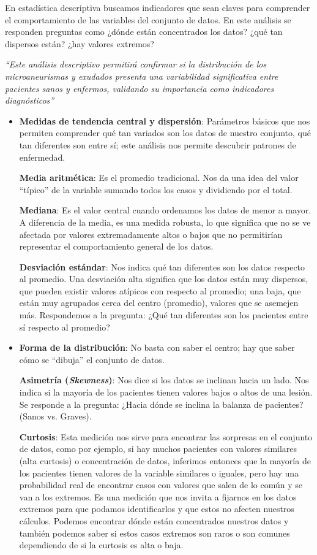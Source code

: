 En estadística descriptiva buscamos indicadores que sean claves para comprender el comportamiento de las variables del conjunto de datos. En este análisis se responden preguntas como ¿dónde están concentrados los datos? ¿qué tan dispersos están? ¿hay valores extremos?

\textit{``Este análisis descriptivo permitirá confirmar si la distribución de los microaneurismas y exudados presenta una variabilidad significativa entre pacientes sanos y enfermos, validando su importancia como indicadores diagnósticos''}

\begin{itemize}
    \item \textbf{Medidas de tendencia central y dispersión}: Parámetros básicos que nos permiten comprender qué tan variados son los datos de nuestro conjunto, qué tan diferentes son entre sí; este análisis nos permite descubrir patrones de enfermedad. 
    
    \textbf{Media aritmética}: Es el promedio tradicional. Nos da una idea del valor \enquote{típico} de la variable sumando todos los casos y dividiendo por el total.

    \textbf{Mediana}: Es el valor central cuando ordenamos los datos de menor a mayor. A diferencia de la media, es una medida robusta, lo que significa que no se ve afectada por valores extremadamente altos o bajos que no permitirían representar el comportamiento general de los datos.

    \textbf{Desviación estándar}: Nos indica qué tan diferentes son los datos respecto al promedio. Una desviación alta significa que los datos están muy dispersos, que pueden existir valores atípicos con respecto al promedio; una baja, que están muy agrupados cerca del centro (promedio), valores que se asemejen más. Respondemos a la pregunta: ¿Qué tan diferentes son los pacientes entre sí respecto al promedio?

    \item \textbf{Forma de la distribución}: No basta con saber el centro; hay que saber cómo se ``dibuja'' el conjunto de datos.

    \textbf{Asimetría (\textit{Skewness})}: Nos dice si los datos se inclinan hacia un lado. Nos indica si la mayoría de los pacientes tienen valores bajos o altos de una lesión.  Se responde a la pregunta: ¿Hacia dónde se inclina la balanza de pacientes? (Sanos vs. Graves).

    \textbf{Curtosis}: Esta medición nos sirve para encontrar las sorpresas en el conjunto de datos, como por ejemplo, si hay muchos pacientes con valores similares (alta curtosis) o concentración de datos, inferimos entonces que la mayoría de los pacientes tienen valores de la variable similares o iguales, pero hay una probabilidad real de encontrar casos con valores que salen de lo común y se van a los extremos. Es una medición que nos invita a fijarnos en los datos extremos para que podamos identificarlos y que estos no afecten nuestros cálculos. Podemos encontrar dónde están concentrados nuestros datos y también podemos saber si estos casos extremos son raros o son comunes dependiendo de si la curtosis es alta o baja. 


\end{itemize}
